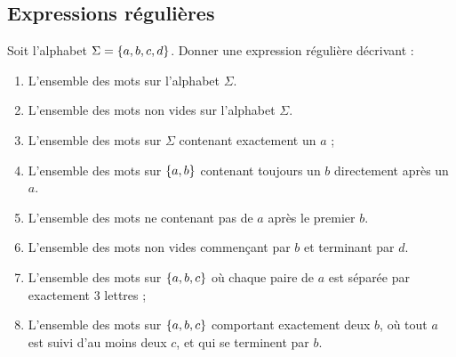 \documentclass[a4paper,french,bookmarks]{book}
\begin{document}
    \subsection{Expressions régulières}
    
    Soit l'alphabet $\Sigma = \left\{a, b, c, d\right\}$. Donner une expression régulière décrivant :
    
    \begin{enumerate}
        \item L'ensemble des mots sur l'alphabet $\Sigma$.
        
        
        \item L'ensemble des mots non vides sur l'alphabet $\Sigma$.
        
        
        \item L'ensemble des mots sur $\Sigma$ contenant exactement un $a$ ;
        
        
        \item L'ensemble des mots sur $\left\{a, b\right\}$ contenant toujours un $b$ directement après un $a$.
        
        
        \item L'ensemble des mots ne contenant pas de $a$ après le premier $b$.
        
        
        \item L'ensemble des mots non vides commençant par $b$ et terminant par $d$.
        
        
        \item L'ensemble des mots sur $\left\{a, b, c\right\}$ où chaque paire de $a$ est séparée par exactement 3 lettres ;
        
        
        \item L'ensemble des mots sur $\left\{a, b, c\right\}$ comportant exactement deux $b$, où tout $a$ est suivi d'au moins deux $c$, et qui se terminent par $b$.
        
    \end{enumerate}
    
\end{document}
